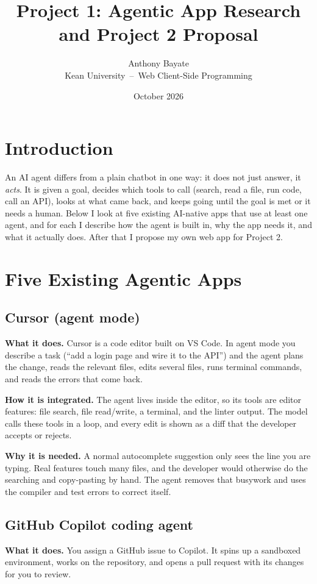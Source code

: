 \documentclass[11pt]{article}
\title{Project 1: Agentic App Research and Project 2 Proposal}
\author{Anthony Bayate\\Kean University \,--\, Web Client-Side Programming}
\date{October 2026}
\begin{document}
\maketitle

\section{Introduction}
An AI agent differs from a plain chatbot in one way: it does not just answer, it
\emph{acts}. It is given a goal, decides which tools to call (search, read a file,
run code, call an API), looks at what came back, and keeps going until the goal is
met or it needs a human. Below I look at five existing AI-native apps that use at
least one agent, and for each I describe how the agent is built in, why the app
needs it, and what it actually does. After that I propose my own web app for
Project 2.

\section{Five Existing Agentic Apps}

\subsection{Cursor (agent mode)}
\textbf{What it does.} Cursor is a code editor built on VS Code. In agent mode you
describe a task (``add a login page and wire it to the API'') and the agent plans
the change, reads the relevant files, edits several files, runs terminal commands,
and reads the errors that come back.

\textbf{How it is integrated.} The agent lives inside the editor, so its tools are
editor features: file search, file read/write, a terminal, and the linter output.
The model calls these tools in a loop, and every edit is shown as a diff that the
developer accepts or rejects.

\textbf{Why it is needed.} A normal autocomplete suggestion only sees the line you
are typing. Real features touch many files, and the developer would otherwise do the
searching and copy-pasting by hand. The agent removes that busywork and uses the
compiler and test errors to correct itself.

\subsection{GitHub Copilot coding agent}
\textbf{What it does.} You assign a GitHub issue to Copilot. It spins up a
sandboxed environment, works on the repository, and opens a pull request with its
changes for you to review.
\end{document}
